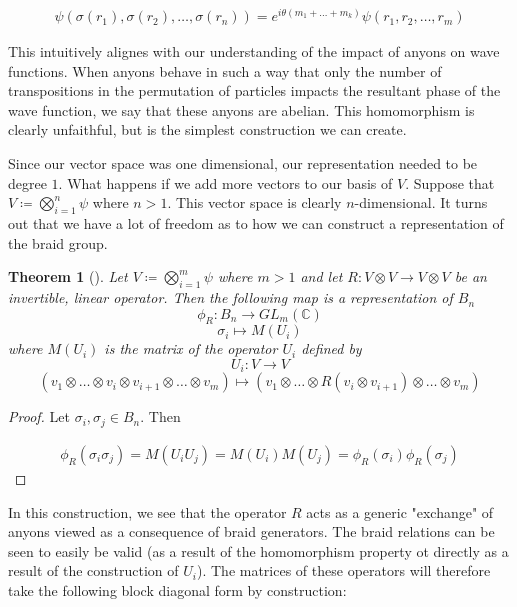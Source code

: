 \documentclass[10pt]{ucthesis}
\newcommand{\C}{\mathbb{C}}
\newtheorem{theorem}[definition]{Theorem}
\begin{document}
\begin{equation}
	\begin{aligned}
		\psi(\sigma(r_1),\sigma(r_2),\hdots,\sigma(r_n)) = e^{i\theta(m_1+\hdots+m_k)} \psi(r_1,r_2,\hdots,r_m)
	\end{aligned}
\end{equation}

This intuitively alignes with our understanding of the impact of anyons on wave functions. When anyons behave in such a way that only the number of transpositions in the permutation of particles impacts the resultant phase of the wave function, we say that these anyons are abelian. This homomorphism is clearly unfaithful, but is the simplest construction we can create.

Since our vector space was one dimensional, our representation needed to be degree $1$. What happens if we add more vectors to our basis of $V$. Suppose that $V \coloneq \bigotimes_{i=1}^n\psi$ where $n>1$. This vector space is clearly $n$-dimensional. It turns out that we have a lot of freedom as to how we can construct a representation of the braid group.

\begin{theorem}[\cite{Riverside}]
	Let $V \coloneq \bigotimes_{i=1}^m\psi$ where $m>1$ and let $R: V\otimes V \rightarrow V\otimes V $ be an invertible, linear operator. Then the following map is a representation of $B_n$
$$\phi_R:B_n\rightarrow GL_m(\C)$$
$$\sigma_i \mapsto M(U_i)$$
where $M(U_i)$ is the matrix of the operator $U_i$ defined by
$$U_i:V\rightarrow V$$
$$(v_1\otimes\hdots\otimes v_i\otimes v_{i+1}\otimes\hdots\otimes v_m)\mapsto (v_1\otimes\hdots\otimes R(v_i\otimes v_{i+1})\otimes\hdots\otimes v_m)$$
\end{theorem}

\noindent \begin{proof} Let $\sigma_i,\sigma_j\in B_n$. Then

\begin{equation}
	\begin{aligned}
		\phi_R(\sigma_i\sigma_j) = M(U_iU_j) = M(U_i)M(U_j) =  \phi_R(\sigma_i)\phi_R(\sigma_j)
	\end{aligned}
\end{equation}
 \end{proof}

In this construction, we see that the operator $R$ acts as a generic "exchange" of anyons viewed as a consequence of braid generators. The braid relations can be seen to easily be valid (as a result of the homomorphism property ot directly as a result of the construction of $U_i$). The matrices of these operators will therefore take the following block diagonal form by construction:
\end{document}
